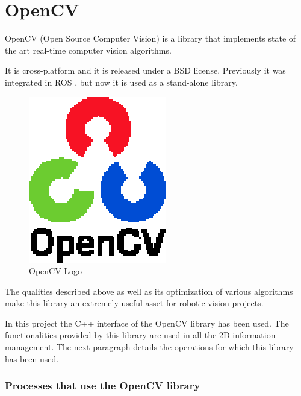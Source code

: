 \section{OpenCV}
\label{opencv}

OpenCV\cite{opencv} (Open Source Computer Vision) is a library that implements state of the art real-time computer vision 
algorithms. 

It is cross-platform and it is released under a BSD\cite{BSD} license. Previously it was integrated in ROS \cite{ros}, but
now it is used as a stand-alone library.  

\begin{figure}[h]
	\begin{center}
    \includegraphics[scale=1]{img/opencv/logo.eps}
	\caption[OpenCV Logo]{OpenCV Logo}
	\end{center}
\end{figure}

The qualities described above as well as its optimization of various algorithms make this library an extremely useful asset for robotic vision projects. 


In this project the C++ interface of the OpenCV library has been used. The functionalities provided by this library are used in all the 2D information management. The next paragraph details the operations for which this library has been used. 

\subsubsection{Processes that use the OpenCV library}

